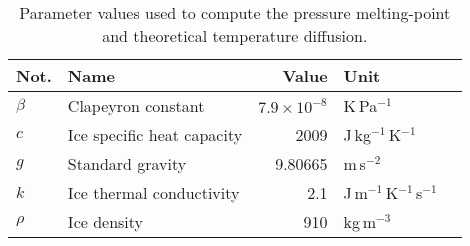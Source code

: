 \documentclass[utf8]{article}
\begin{document}
    \begin{table}
      \caption{%
        Parameter values used to compute the pressure melting-point and
        theoretical temperature diffusion.}
      \label{tab:parameters}
      {\begin{tabular}{llrll}
        \hline
        Not.    & Name & Value & Unit \\
        \hline
        $\beta$ & Clapeyron constant
                & $7.9\times10^{-8}$    & K\,Pa$^{-1}$                      \\
        $c$     & Ice specific heat capacity
                & 2009                  & J\,kg$^{-1}$\,K$^{-1}$            \\
        $g$     & Standard gravity
                & 9.80665               & m\,s$^{-2}$                       \\
        $k$     & Ice thermal conductivity
                & 2.1                   & J\,m$^{-1}$\,K$^{-1}$\,s$^{-1}$   \\
        $\rho$  & Ice density
                & 910                   & kg\,m$^{-3}$                      \\
        \hline
      \end{tabular}}
    \end{table}

\end{document}
